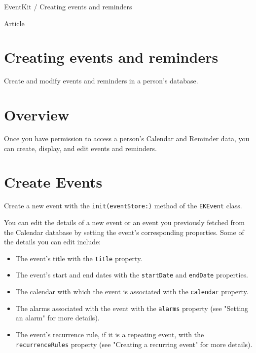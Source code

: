 \documentclass{article}
\title{}
\author{}
\date{}
\begin{document}
EventKit / Creating events and reminders

Article

\section*{Creating events and reminders}
Create and modify events and reminders in a person's database.

\section*{Overview}
Once you have permission to access a person's Calendar and Reminder data, you can create, display, and edit
events and reminders.

\section*{Create Events}
Create a new event with the \texttt{init(eventStore:)} method of the \texttt{EKEvent} class.

You can edit the details of a new event or an event you previously fetched from the Calendar database by setting
the event's corresponding properties. Some of the details you can edit include:

\begin{itemize}
    \item The event's title with the \texttt{title} property.
    \item The event's start and end dates with the \texttt{startDate} and \texttt{endDate} properties.
    \item The calendar with which the event is associated with the \texttt{calendar} property.
    \item The alarms associated with the event with the \texttt{alarms} property (see "Setting an alarm" for more details).
    \item The event's recurrence rule, if it is a repeating event, with the \texttt{recurrenceRules} property (see "Creating a
recurring event" for more details).
\end{itemize}

\noindent{}
\end{document}
